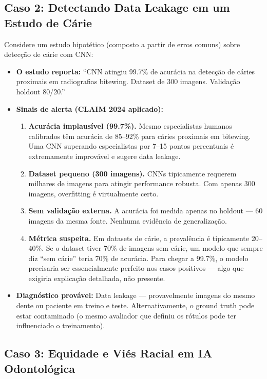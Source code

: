 \subsection{Caso 2: Detectando Data Leakage em um Estudo de Cárie}

Considere um estudo hipotético (composto a partir de erros comuns) sobre detecção de cárie com CNN:

\begin{itemize}
    \item \textbf{O estudo reporta:} ``CNN atingiu 99.7\% de acurácia na detecção de cáries proximais em radiografias bitewing. Dataset de 300 imagens. Validação holdout 80/20.''
    \item \textbf{Sinais de alerta (CLAIM 2024 aplicado):}
    \begin{enumerate}
        \item \textbf{Acurácia implausível (99.7\%).} Mesmo especialistas humanos calibrados têm acurácia de 85--92\% para cáries proximais em bitewing. Uma CNN superando especialistas por 7--15 pontos percentuais é extremamente improvável e sugere data leakage.
        \item \textbf{Dataset pequeno (300 imagens).} CNNs tipicamente requerem milhares de imagens para atingir performance robusta. Com apenas 300 imagens, overfitting é virtualmente certo.
        \item \textbf{Sem validação externa.} A acurácia foi medida apenas no holdout — 60 imagens da mesma fonte. Nenhuma evidência de generalização.
        \item \textbf{Métrica suspeita.} Em datasets de cárie, a prevalência é tipicamente 20--40\%. Se o dataset tiver 70\% de imagens sem cárie, um modelo que sempre diz ``sem cárie'' teria 70\% de acurácia. Para chegar a 99.7\%, o modelo precisaria ser essencialmente perfeito nos casos positivos — algo que exigiria explicação detalhada, não presente.
    \end{enumerate}
    \item \textbf{Diagnóstico provável:} Data leakage — provavelmente imagens do mesmo dente ou paciente em treino e teste. Alternativamente, o ground truth pode estar contaminado (o mesmo avaliador que definiu os rótulos pode ter influenciado o treinamento).
\end{itemize}

\subsection{Caso 3: Equidade e Viés Racial em IA Odontológica}

